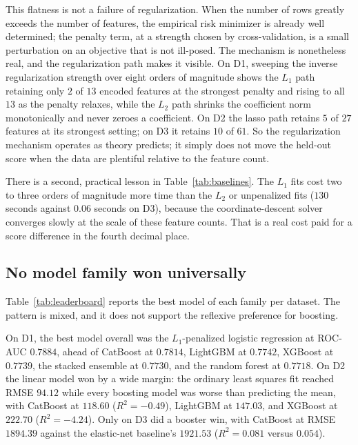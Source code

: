 \documentclass{ieeeaccess}
\begin{document}
This flatness is not a failure of regularization. When the number of rows greatly exceeds the number of features, the empirical risk minimizer is already well determined; the penalty term, at a strength chosen by cross-validation, is a small perturbation on an objective that is not ill-posed. The mechanism is nonetheless real, and the regularization path makes it visible. On D1, sweeping the inverse regularization strength over eight orders of magnitude shows the $L_1$ path retaining only $2$ of $13$ encoded features at the strongest penalty and rising to all $13$ as the penalty relaxes, while the $L_2$ path shrinks the coefficient norm monotonically and never zeroes a coefficient. On D2 the lasso path retains $5$ of $27$ features at its strongest setting; on D3 it retains $10$ of $61$. So the regularization mechanism operates as theory predicts; it simply does not move the held-out score when the data are plentiful relative to the feature count.

There is a second, practical lesson in Table~\ref{tab:baselines}. The $L_1$ fits cost two to three orders of magnitude more time than the $L_2$ or unpenalized fits ($130$ seconds against $0.06$ seconds on D3), because the coordinate-descent solver converges slowly at the scale of these feature counts. That is a real cost paid for a score difference in the fourth decimal place.

\subsection{No model family won universally}
Table~\ref{tab:leaderboard} reports the best model of each family per dataset. The pattern is mixed, and it does not support the reflexive preference for boosting.

On D1, the best model overall was the $L_1$-penalized logistic regression at ROC-AUC $0.7884$, ahead of CatBoost at $0.7814$, LightGBM at $0.7742$, XGBoost at $0.7739$, the stacked ensemble at $0.7730$, and the random forest at $0.7718$. On D2 the linear model won by a wide margin: the ordinary least squares fit reached RMSE $94.12$ while every boosting model was worse than predicting the mean, with CatBoost at $118.60$ ($R^2 = -0.49$), LightGBM at $147.03$, and XGBoost at $222.70$ ($R^2 = -4.24$). Only on D3 did a booster win, with CatBoost at RMSE $1894.39$ against the elastic-net baseline's $1921.53$ ($R^2 = 0.081$ versus $0.054$).
\end{document}
